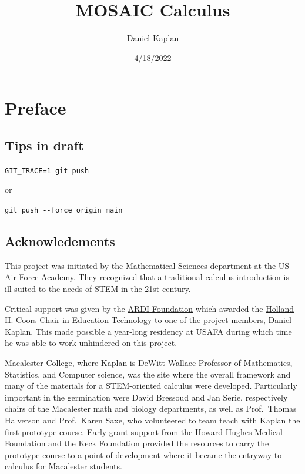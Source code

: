\documentclass[
  letterpaper,
  DIV=11,
  numbers=noendperiod,
  oneside]{article}
\title{MOSAIC Calculus}
\author{Daniel Kaplan}
\date{4/18/2022}
\renewcommand*\contentsname{Table of contents}
\newcommand\contentsname{Table of contents}
\begin{document}
\maketitle

\ifdefined\Shaded\renewenvironment{Shaded}{\begin{tcolorbox}[borderline west={3pt}{0pt}{shadecolor}, breakable, sharp corners, interior hidden, enhanced, frame hidden, boxrule=0pt]}{\end{tcolorbox}}\fi

\renewcommand*\contentsname{Table of contents}
{
\hypersetup{linkcolor=}
\setcounter{tocdepth}{2}
\tableofcontents
}
\hypertarget{preface}{%
\chapter*{Preface}\label{preface}}

\hypertarget{tips-in-draft}{%
\section*{Tips in draft}\label{tips-in-draft}}

\texttt{GIT\_TRACE=1\ git\ push}

or

\texttt{git\ push\ -\/-force\ origin\ main}

\hypertarget{acknowledements}{%
\section*{Acknowledements}\label{acknowledements}}

This project was initiated by the Mathematical Sciences department at
the US Air Force Academy. They recognized that a traditional calculus
introduction is ill-suited to the needs of STEM in the 21st century.

Critical support was given by the \href{http://ardifoundation.org}{ARDI
Foundation} which awarded the
\href{http://www.ardifoundation.org/coors-chair/}{Holland H. Coors Chair
in Education Technology} to one of the project members, Daniel Kaplan.
This made possible a year-long residency at USAFA during which time he
was able to work unhindered on this project.

Macalester College, where Kaplan is DeWitt Wallace Professor of
Mathematics, Statistics, and Computer science, was the site where the
overall framework and many of the materials for a STEM-oriented calculus
were developed. Particularly important in the germination were David
Bressoud and Jan Serie, respectively chairs of the Macalester math and
biology departments, as well as Prof.~Thomas Halverson and Prof.~Karen
Saxe, who volunteered to team teach with Kaplan the first prototype
course. Early grant support from the Howard Hughes Medical Foundation
and the Keck Foundation provided the resources to carry the prototype
course to a point of development where it became the entryway to
calculus for Macalester students.
\end{document}
